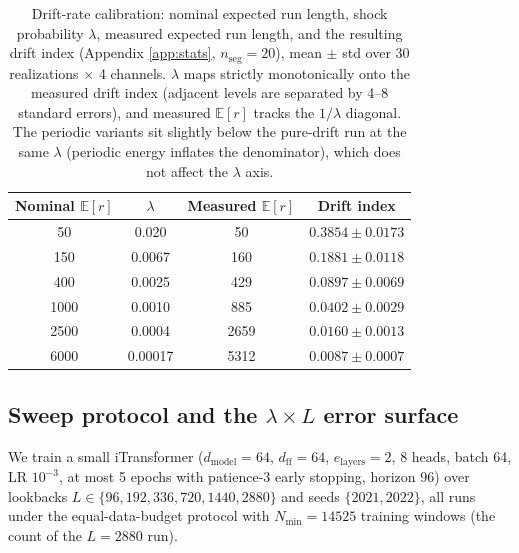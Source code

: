 \begin{table}[t]
\caption{Drift-rate calibration: nominal expected run length, shock probability $\lambda$, measured expected run length, and the resulting drift index (Appendix \ref{app:stats}, $n_{\mathrm{seg}}{=}20$), mean $\pm$ std over 30 realizations $\times$ 4 channels. $\lambda$ maps strictly monotonically onto the measured drift index (adjacent levels are separated by 4--8 standard errors), and measured $\mathbb{E}[r]$ tracks the $1/\lambda$ diagonal. The periodic variants sit slightly below the pure-drift run at the same $\lambda$ (periodic energy inflates the denominator), which does not affect the $\lambda$ axis.}
\label{tab:calibration}
\centering\small
\begin{tabular}{cccc}
\toprule
Nominal $\mathbb{E}[r]$ & $\lambda$ & Measured $\mathbb{E}[r]$ & Drift index \\
\midrule
50 & 0.020 & 50 & $0.3854 \pm 0.0173$ \\
150 & 0.0067 & 160 & $0.1881 \pm 0.0118$ \\
400 & 0.0025 & 429 & $0.0897 \pm 0.0069$ \\
1000 & 0.0010 & 885 & $0.0402 \pm 0.0029$ \\
2500 & 0.0004 & 2659 & $0.0160 \pm 0.0013$ \\
6000 & 0.00017 & 5312 & $0.0087 \pm 0.0007$ \\
\bottomrule
\end{tabular}
\end{table}

\subsection{Sweep protocol and the \texorpdfstring{$\lambda \times L$}{lambda x L} error surface}

We train a small iTransformer ($d_{\mathrm{model}}{=}64$, $d_{\mathrm{ff}}{=}64$, $e_{\mathrm{layers}}{=}2$, 8 heads, batch 64, LR $10^{-3}$, at most 5 epochs with patience-3 early stopping, horizon 96) over lookbacks $L \in \{96, 192, 336, 720, 1440, 2880\}$ and seeds $\{2021, 2022\}$, all runs under the equal-data-budget protocol with $N_{\min} = 14525$ training windows (the count of the $L{=}2880$ run).

